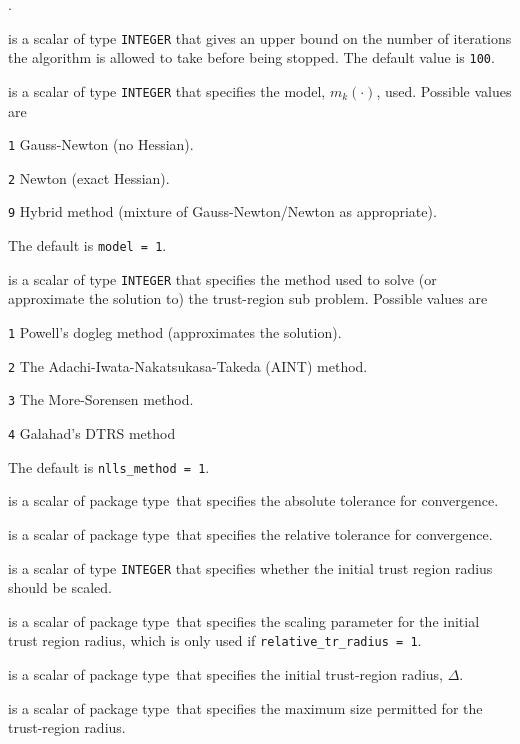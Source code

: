 \documentclass{spec}
\newcommand{\scalarinteger}{is a scalar of type {\tt INTEGER} }
\newcommand{\scalarreal}{is a scalar of package type\ }
\begin{document}
.

\begin{description}

 \scalarinteger that gives an upper bound on the number
of iterations the algorithm is allowed to take before being stopped.  The default value is {\tt 100}.

 \scalarinteger that specifies the model, $m_k(\cdot)$, used.  Possible values are 
\begin{description}
  \item{\tt 1} Gauss-Newton (no Hessian).
  \item{\tt 2} Newton (exact Hessian).
  \item{\tt 9} Hybrid method (mixture of Gauss-Newton/Newton as appropriate).
\end{description}
The default is {\tt model = 1}.

 \scalarinteger that specifies the method used to solve 
(or approximate the solution to) the trust-region sub problem.  Possible values are
\begin{description}
  \item{\tt 1} Powell's dogleg method (approximates the solution).
  \item{\tt 2} The Adachi-Iwata-Nakatsukasa-Takeda (AINT) method.
  \item{\tt 3} The More-Sorensen method.
  \item{\tt 4} Galahad's DTRS method
\end{description}
The default is {\tt nlls\_method = 1}.

 \scalarreal that specifies the absolute tolerance for convergence.

 \scalarreal that specifies the relative tolerance for convergence.

 \scalarinteger that specifies whether the initial trust region 
radius should be scaled.

 \scalarreal that specifies the scaling parameter for the initial trust region radius, which is only used if {\tt relative\_tr\_radius = 1}.

 \scalarreal that specifies the initial trust-region radius, $\Delta$.

 \scalarreal that specifies the maximum size permitted for the trust-region radius.


\end{description}
\end{document}
